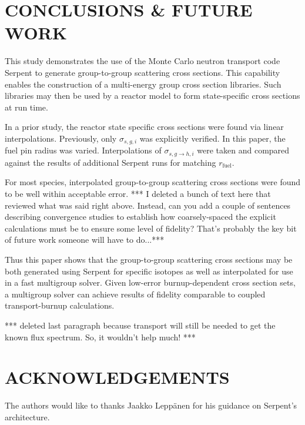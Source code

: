 \documentclass{physor2012}
\begin{document}

\section{CONCLUSIONS \& FUTURE WORK}
\label{sec:conclusions}

This study demonstrates the use of the Monte Carlo neutron transport code Serpent to generate group-to-group scattering
cross sections.  This capability enables the construction of a multi-energy
group cross section libraries.  Such libraries may then be used by a reactor
model to form state-specific cross sections at run time.

In a prior study, the reactor state specific cross sections were found
via linear interpolations.  Previously, only $\sigma_{s,g,i}$ was
explicitly verified.  In this paper, the fuel pin radius was varied.
Interpolations of $\sigma_{s,g\to h,i}$ were taken and compared against
the results of additional Serpent runs for matching $r_{\mbox{fuel}}$.

For most species, interpolated group-to-group scattering cross sections
were found to be well within acceptable error.  *** I deleted a bunch of text here that reviewed what was said right above.  Instead, can you add a couple of sentences describing convergence studies to establish how coarsely-spaced the explicit calculations must be to ensure some level of fidelity?  That's probably the key bit of future work someone will have to do...***

Thus this paper shows that the group-to-group scattering cross sections may be
both generated using Serpent for specific isotopes as well as interpolated for use in a fast multigroup solver.  Given low-error burnup-dependent cross section sets, a multigroup solver can achieve results of fidelity comparable to coupled transport-burnup calculations.

*** deleted last paragraph because transport will still be needed to get the known flux spectrum.  So, it wouldn't help much! ***


\section*{ACKNOWLEDGEMENTS}
The authors would like to thanks Jaakko Lepp\"{a}nen for his guidance
on Serpent's architecture.


%
\setlength{\baselineskip}{12pt}


\end{document}

